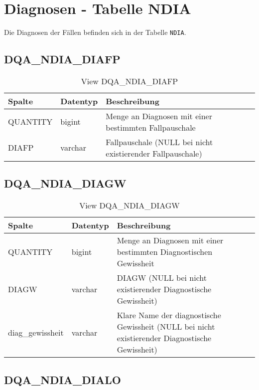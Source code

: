 \chapter{Diagnosen - Tabelle NDIA}
  Die Diagnosen der Fällen befinden sich in der Tabelle \texttt{NDIA}.

  \section{DQA\_NDIA\_DIAFP}

  \begin{table}[ht]
    \centering
    \caption{View DQA\_NDIA\_DIAFP}
    \label{tab:dqandiadiafp}
    \begin{tabular}{||l|l|p{10cm}||}
      \hline
      Spalte & Datentyp & Beschreibung \\ [0.5ex] \hline \hline
QUANTITY & bigint & Menge an Diagnosen mit einer bestimmten Fallpauschale \\ \hline
DIAFP & varchar & Fallpauschale (NULL bei nicht existierender Fallpauschale)\\ \hline
    \end{tabular}
  \end{table}
\clearpage 
  \section{DQA\_NDIA\_DIAGW}

  \begin{table}[ht]
    \centering
    \caption{View DQA\_NDIA\_DIAGW}
    \label{tab:dqandiadiagw}
    \begin{tabular}{||l|l|p{10cm}||}
      \hline
      Spalte & Datentyp & Beschreibung \\ [0.5ex] \hline \hline
QUANTITY & bigint & Menge an Diagnosen mit einer bestimmten Diagnostischen Gewissheit \\ \hline
DIAGW & varchar & DIAGW (NULL bei nicht existierender Diagnostische Gewissheit)\\ \hline
diag\_gewissheit & varchar & Klare Name der diagnostische Gewissheit (NULL bei nicht existierender Diagnostische Gewissheit)\\ \hline
    \end{tabular}
  \end{table}

  \section{DQA\_NDIA\_DIALO}

